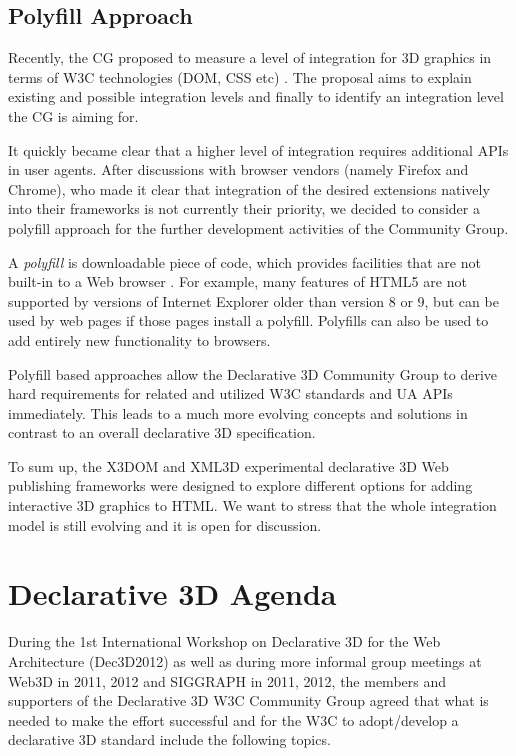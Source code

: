 \documentclass[review]{acmsiggraph}
\begin{document}
\subsection{Polyfill Approach}

Recently, the CG proposed to measure a level of integration for 3D graphics in terms of W3C technologies (DOM, CSS etc) \cite{Dec3D-LevelsOfIntegration}. The proposal aims to explain existing and possible integration levels and finally to identify an integration level the CG is aiming for.

It quickly became clear that a higher level of integration requires additional APIs in user agents. After discussions with browser vendors (namely Firefox and Chrome), who made it clear that integration of the desired extensions natively into their frameworks is not currently their priority, we decided to consider a polyfill approach for the further development activities of the Community Group.

A \textit{polyfill} is downloadable piece of code, which provides facilities that are not built-in to a Web browser \cite{Sharp2010}. For example, many features of HTML5 are not supported by versions of Internet Explorer older than version 8 or 9, but can be used by web pages if those pages install a polyfill. Polyfills can also be used to add entirely new functionality to browsers.

Polyfill based approaches allow the Declarative 3D Community Group to derive hard requirements for related and utilized W3C standards and UA APIs immediately. This leads to a much more evolving concepts and solutions in contrast to an overall declarative 3D specification.

To sum up, the X3DOM and XML3D experimental declarative 3D Web publishing frameworks were designed to explore different options for adding interactive 3D graphics to HTML. We want to stress that the whole integration model is still evolving and it is open for discussion.


\section{Declarative 3D Agenda}

\label{sec:Agenda}
During the 1st International Workshop on Declarative 3D for the Web Architecture (Dec3D2012) \cite{Dec3D2012} as well as during more informal group meetings at Web3D in 2011, 2012 and SIGGRAPH in 2011, 2012, the members and supporters of the Declarative 3D W3C Community Group agreed that what is needed to make the effort successful and for the W3C to adopt/develop a declarative 3D standard include the following topics.
\end{document}
